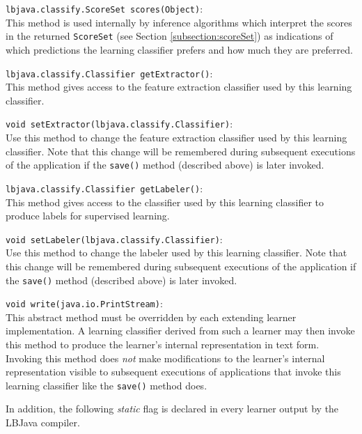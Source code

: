 \begin{list}{}{}
\item[{\tt lbjava.classify.ScoreSet scores(Object)}:] ~\\
This method is used internally by inference algorithms which interpret the
scores in the returned {\tt ScoreSet} (see Section \ref{subsection:scoreSet})
as indications of which predictions the learning classifier prefers and how
much they are preferred.

\item[{\tt lbjava.classify.Classifier getExtractor()}:] ~\\
This method gives access to the feature extraction classifier used by this
learning classifier.

\item[{\tt void setExtractor(lbjava.classify.Classifier)}:] ~\\
Use this method to change the feature extraction classifier used by this
learning classifier.  Note that this change will be remembered during
subsequent executions of the application if the {\tt save()} method (described
above) is later invoked.

\item[{\tt lbjava.classify.Classifier getLabeler()}:] ~\\
This method gives access to the classifier used by this learning classifier to
produce labels for supervised learning.

\item[{\tt void setLabeler(lbjava.classify.Classifier)}:] ~\\
Use this method to change the labeler used by this learning classifier.  Note
that this change will be remembered during subsequent executions of the
application if the {\tt save()} method (described above) is later invoked.

\item[{\tt void write(java.io.PrintStream)}:] ~\\
This abstract method must be overridden by each extending learner
implementation.  A learning classifier derived from such a learner may then
invoke this method to produce the learner's internal representation in text
form.  Invoking this method does \emph{not} make modifications to the
learner's internal representation visible to subsequent executions of
applications that invoke this learning classifier like the {\tt save()} method
does.
\end{list}

In addition, the following \emph{static} flag is declared in every learner
output by the LBJava compiler.

